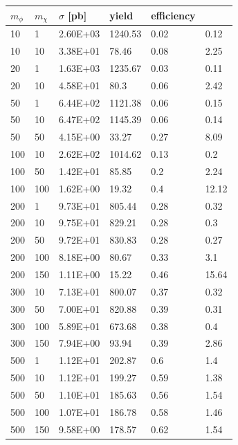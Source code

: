 \begin{table}[]
\small
\centering
\begin{tabular}{llllll}
$m_\phi$  &  $m_\chi$   &  $\sigma$ [pb] &   yield &  efficiency \\\hline
10    & 1    & 2.60E+03 & 1240.53 & 0.02 & 0.12        \\
10    & 10   & 3.38E+01 & 78.46   & 0.08 & 2.25        \\
20    & 1    & 1.63E+03 & 1235.67 & 0.03 & 0.11        \\
20    & 10   & 4.58E+01 & 80.3    & 0.06 & 2.42        \\
50    & 1    & 6.44E+02 & 1121.38 & 0.06 & 0.15        \\
50    & 10   & 6.47E+02 & 1145.39 & 0.06 & 0.14        \\
50    & 50   & 4.15E+00 & 33.27   & 0.27 & 8.09        \\
100   & 10   & 2.62E+02 & 1014.62 & 0.13 & 0.2         \\
100   & 50   & 1.42E+01 & 85.85   & 0.2  & 2.24        \\
100   & 100  & 1.62E+00 & 19.32   & 0.4  & 12.12       \\
200   & 1    & 9.73E+01 & 805.44  & 0.28 & 0.32        \\
200   & 10   & 9.75E+01 & 829.21  & 0.28 & 0.3         \\
200   & 50   & 9.72E+01 & 830.83  & 0.28 & 0.27        \\
200   & 100  & 8.18E+00 & 80.67   & 0.33 & 3.1         \\
200   & 150  & 1.11E+00 & 15.22   & 0.46 & 15.64       \\
300   & 10   & 7.13E+01 & 800.07  & 0.37 & 0.32        \\
300   & 50   & 7.00E+01 & 820.88  & 0.39 & 0.31        \\
300   & 100  & 5.89E+01 & 673.68  & 0.38 & 0.4         \\
300   & 150  & 7.94E+00 & 93.94   & 0.39 & 2.86        \\
500   & 1    & 1.12E+01 & 202.87  & 0.6  & 1.4         \\
500   & 10   & 1.12E+01 & 199.27  & 0.59 & 1.38        \\
500   & 50   & 1.10E+01 & 185.63  & 0.56 & 1.54        \\
500   & 100  & 1.07E+01 & 186.78  & 0.58 & 1.46        \\
500   & 150  & 9.58E+00 & 178.57  & 0.62 & 1.54        \\

\end{tabular}
\end{table}
